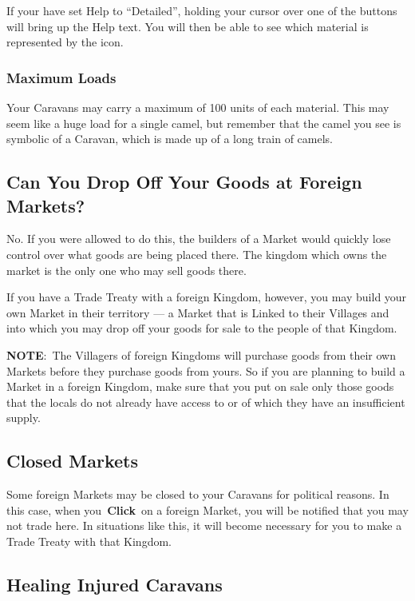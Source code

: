If your have set Help to “Detailed”, holding your cursor over one of the buttons will bring up the Help text. You will then be able to see which material is represented by the icon.

\subsubsection{Maximum Loads}

Your Caravans may carry a maximum of 100 units of each material. This may seem like a huge load for a single camel, but remember that the camel you see is symbolic of a Caravan, which is made up of a long train of camels.

\subsection{Can You Drop Off Your Goods at Foreign Markets?}


No. If you were allowed to do this, the builders of a Market would quickly lose control over what goods are being placed there. The kingdom which owns the market is the only one who may sell goods there.

If you have a Trade Treaty with a foreign Kingdom, however, you may build your own Market in their territory --- a Market that is Linked to their Villages and into which you may drop off your goods for sale to the people of that Kingdom.

\textbf{NOTE}: The Villagers of foreign Kingdoms will purchase goods from their own Markets before they purchase goods from yours. So if you are planning to build a Market in a foreign Kingdom, make sure that you put on sale only those goods that the locals do not already have access to or of which they have an insufficient supply.

\subsection{Closed Markets}

Some foreign Markets may be closed to your Caravans for political reasons. In this case, when you \textbf{Click} on a foreign Market, you will be notified that you may not trade here. In situations like this, it will become necessary for you to make a Trade Treaty with that Kingdom.

\subsection{Healing Injured Caravans}

